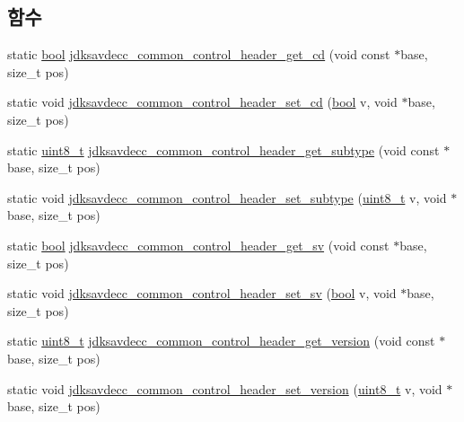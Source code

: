 \subsection*{함수}
\begin{DoxyCompactItemize}
\item 
static \hyperlink{avb__gptp_8h_af6a258d8f3ee5206d682d799316314b1}{bool} \hyperlink{group__jdksavdecc__avtp__common__control__header_gafcc86a6636d8793da33a2da4995b3a15}{jdksavdecc\+\_\+common\+\_\+control\+\_\+header\+\_\+get\+\_\+cd} (void const $\ast$base, size\+\_\+t pos)
\item 
static void \hyperlink{group__jdksavdecc__avtp__common__control__header_ga25637b3f3eeae369125694cd5692e606}{jdksavdecc\+\_\+common\+\_\+control\+\_\+header\+\_\+set\+\_\+cd} (\hyperlink{avb__gptp_8h_af6a258d8f3ee5206d682d799316314b1}{bool} v, void $\ast$base, size\+\_\+t pos)
\item 
static \hyperlink{stdint_8h_aba7bc1797add20fe3efdf37ced1182c5}{uint8\+\_\+t} \hyperlink{group__jdksavdecc__avtp__common__control__header_ga42ef04eef2565c32449a0593033de47b}{jdksavdecc\+\_\+common\+\_\+control\+\_\+header\+\_\+get\+\_\+subtype} (void const $\ast$base, size\+\_\+t pos)
\item 
static void \hyperlink{group__jdksavdecc__avtp__common__control__header_ga4418723fafa2bb29fdd1237f17b0a150}{jdksavdecc\+\_\+common\+\_\+control\+\_\+header\+\_\+set\+\_\+subtype} (\hyperlink{stdint_8h_aba7bc1797add20fe3efdf37ced1182c5}{uint8\+\_\+t} v, void $\ast$base, size\+\_\+t pos)
\item 
static \hyperlink{avb__gptp_8h_af6a258d8f3ee5206d682d799316314b1}{bool} \hyperlink{group__jdksavdecc__avtp__common__control__header_ga00819aee969a77e05716ede751b99201}{jdksavdecc\+\_\+common\+\_\+control\+\_\+header\+\_\+get\+\_\+sv} (void const $\ast$base, size\+\_\+t pos)
\item 
static void \hyperlink{group__jdksavdecc__avtp__common__control__header_ga8f4004578afa74518bedc4545cf437bb}{jdksavdecc\+\_\+common\+\_\+control\+\_\+header\+\_\+set\+\_\+sv} (\hyperlink{avb__gptp_8h_af6a258d8f3ee5206d682d799316314b1}{bool} v, void $\ast$base, size\+\_\+t pos)
\item 
static \hyperlink{stdint_8h_aba7bc1797add20fe3efdf37ced1182c5}{uint8\+\_\+t} \hyperlink{group__jdksavdecc__avtp__common__control__header_ga901a41cbf974ed959f4baaafa2a3c81d}{jdksavdecc\+\_\+common\+\_\+control\+\_\+header\+\_\+get\+\_\+version} (void const $\ast$base, size\+\_\+t pos)
\item 
static void \hyperlink{group__jdksavdecc__avtp__common__control__header_ga8ae4ee3ac7223ea2ccbea0c94af25dc0}{jdksavdecc\+\_\+common\+\_\+control\+\_\+header\+\_\+set\+\_\+version} (\hyperlink{stdint_8h_aba7bc1797add20fe3efdf37ced1182c5}{uint8\+\_\+t} v, void $\ast$base, size\+\_\+t pos)

\end{DoxyCompactItemize}
